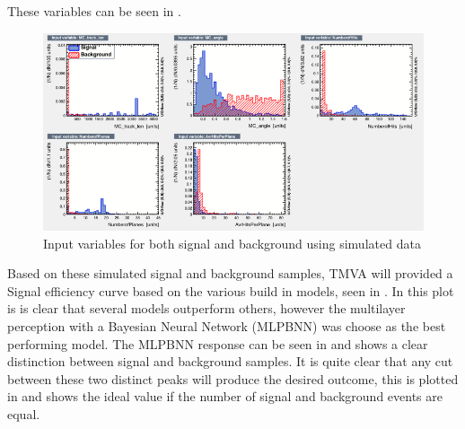 These variables can be seen in .


\begin{figure}[h!]
\centering

\includegraphics[width=\textwidth]{figures/neutrinoTMVA/variables_id_c1.png}
\caption{Input variables for both signal and background using simulated data}
\label{fig:TMVANeuinput}
\end{figure}

Based on these simulated signal and background samples, TMVA will provided a Signal efficiency curve based on the various build in models, seen in . In this plot is is clear that several models outperform others, however the multilayer perception with a Bayesian Neural Network (MLPBNN) was choose as the best performing model. The MLPBNN response can be seen in  and shows a clear distinction between signal and background samples. It is quite clear that any cut between these two distinct peaks will produce the desired outcome, this is plotted in  and shows the ideal value if the number of signal and background events are equal.




